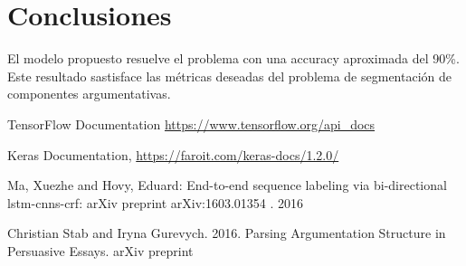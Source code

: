 \documentclass[runningheads]{llncs}
\begin{document}
\section{Conclusiones}

El modelo propuesto resuelve el problema con una accuracy aproximada del 90\%. Este
resultado sastisface las métricas deseadas del problema de segmentación de componentes
argumentativas. 

\begin{thebibliography}{8}

TensorFlow Documentation \url{https://www.tensorflow.org/api_docs} 

Keras Documentation, \url{https://faroit.com/keras-docs/1.2.0/}

Ma, Xuezhe and Hovy, Eduard:
End-to-end sequence labeling via bi-directional lstm-cnns-crf:
arXiv preprint arXiv:1603.01354 . 2016 

Christian Stab and Iryna Gurevych. 2016. Parsing Argumentation Structure in 
Persuasive Essays. arXiv preprint

\end{thebibliography}
\end{document}

